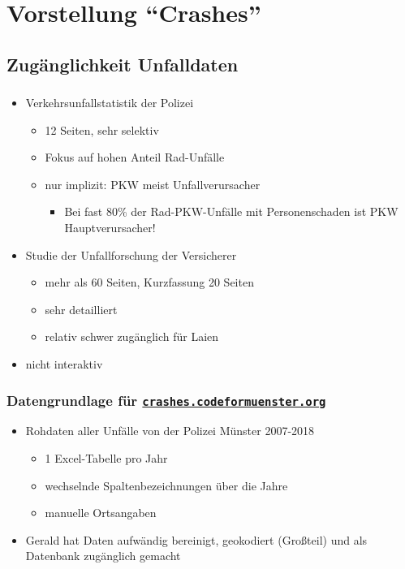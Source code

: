 \documentclass{beamer}
\begin{document}
\section{Vorstellung "`Crashes"'}

\subsection{Zugänglichkeit Unfalldaten}

\begin{frame}
  \frametitle{\subsecname}
  
  \begin{itemize}
    \item Verkehrsunfallstatistik der Polizei \cite{Polizei2019}
    \begin{itemize}
      \item 12 Seiten, sehr selektiv
      \item Fokus auf hohen Anteil Rad-Unfälle
      \item nur implizit: PKW meist Unfallverursacher
      \begin{itemize}
        \item Bei fast 80\% der Rad-PKW-Unfälle mit Personenschaden ist PKW Hauptverursacher!
      \end{itemize}
    \end{itemize}
      \pause
    \item Studie der Unfallforschung der Versicherer \cite{Baier2018}
    \begin{itemize}
      \item mehr als 60 Seiten, Kurzfassung 20 Seiten
      \item sehr detailliert
      \item relativ schwer zugänglich für Laien
    \end{itemize}
    \pause
    \item nicht interaktiv
  \end{itemize}
\end{frame}

\begin{frame}
  \frametitle{Datengrundlage für \href{https://crashes.codeformuenster.org}{\texttt{crashes.codeformuenster.org}}}
  
  \begin{itemize}
    \item Rohdaten aller Unfälle von der Polizei Münster 2007-2018
    \begin{itemize}
      \item 1 Excel-Tabelle pro Jahr
      \item wechselnde Spaltenbezeichnungen über die Jahre
      \item manuelle Ortsangaben
    \end{itemize}
    \pause
    \item Gerald hat Daten aufwändig bereinigt, geokodiert (Großteil) und als Datenbank zugänglich gemacht
  \end{itemize}  
\end{frame}
\end{document}
